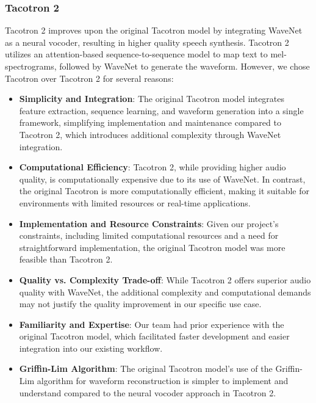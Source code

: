 \subsubsection{Tacotron 2}

Tacotron 2 improves upon the original Tacotron model by integrating WaveNet as a neural vocoder, resulting in higher quality speech synthesis. Tacotron 2 utilizes an attention-based sequence-to-sequence model to map text to mel-spectrograms, followed by WaveNet to generate the waveform. However, we chose Tacotron over Tacotron 2 for several reasons:

\begin{itemize}
    \item \textbf{Simplicity and Integration}: The original Tacotron model integrates feature extraction, sequence learning, and waveform generation into a single framework, simplifying implementation and maintenance compared to Tacotron 2, which introduces additional complexity through WaveNet integration.
    
    \item \textbf{Computational Efficiency}: Tacotron 2, while providing higher audio quality, is computationally expensive due to its use of WaveNet. In contrast, the original Tacotron is more computationally efficient, making it suitable for environments with limited resources or real-time applications.
    
    \item \textbf{Implementation and Resource Constraints}: Given our project's constraints, including limited computational resources and a need for straightforward implementation, the original Tacotron model was more feasible than Tacotron 2.
    
    \item \textbf{Quality vs. Complexity Trade-off}: While Tacotron 2 offers superior audio quality with WaveNet, the additional complexity and computational demands may not justify the quality improvement in our specific use case.
    
    \item \textbf{Familiarity and Expertise}: Our team had prior experience with the original Tacotron model, which facilitated faster development and easier integration into our existing workflow.
    
    \item \textbf{Griffin-Lim Algorithm}: The original Tacotron model's use of the Griffin-Lim algorithm for waveform reconstruction is simpler to implement and understand compared to the neural vocoder approach in Tacotron 2.

    
\end{itemize}

